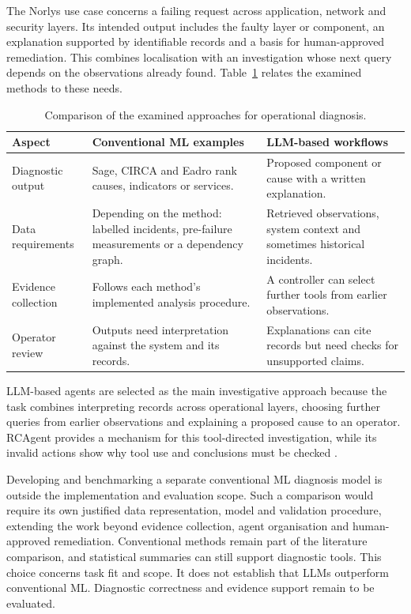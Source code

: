 The Norlys use case concerns a failing request across application, network
and security layers. Its intended output includes the faulty layer or
component, an explanation supported by identifiable records and a basis
for human-approved remediation. This combines localisation with an
investigation whose next query depends on the observations already found.
Table~\ref{tab:sota:ml-llm} relates the examined methods to these needs.

\begin{table}[htbp]
\centering\small
\caption{Comparison of the examined approaches for operational diagnosis.}
\label{tab:sota:ml-llm}
\begin{tabularx}{\textwidth}{@{}>{\raggedright\arraybackslash}p{}>{\raggedright\arraybackslash}X>{\raggedright\arraybackslash}X@{}}
\toprule
Aspect & Conventional ML examples & LLM-based workflows \\
\midrule
Diagnostic output & Sage, CIRCA and Eadro rank causes, indicators or services. & Proposed component or cause with a written explanation. \\
Data requirements & Depending on the method: labelled incidents, pre-failure measurements or a dependency graph. & Retrieved observations, system context and sometimes historical incidents. \\
Evidence collection & Follows each method's implemented analysis procedure. & A controller can select further tools from earlier observations. \\
Operator review & Outputs need interpretation against the system and its records. & Explanations can cite records but need checks for unsupported claims. \\
\bottomrule
\end{tabularx}
\end{table}

LLM-based agents are selected as the main investigative approach because
the task combines interpreting records across operational layers, choosing
further queries from earlier observations and explaining a proposed cause
to an operator. RCAgent provides a mechanism for this tool-directed
investigation, while its invalid actions show why tool use and conclusions
must be checked \parencite[Sections~3 and~5.2]{wang2024rcagent}.

Developing and benchmarking a separate conventional ML diagnosis model is
outside the implementation and evaluation scope. Such a comparison would
require its own justified data representation, model and validation
procedure, extending the work beyond evidence collection, agent
organisation and human-approved remediation. Conventional methods remain
part of the literature comparison, and statistical summaries can still
support diagnostic tools. This choice concerns task fit and scope. It does
not establish that LLMs outperform conventional ML. Diagnostic correctness
and evidence support remain to be evaluated.

